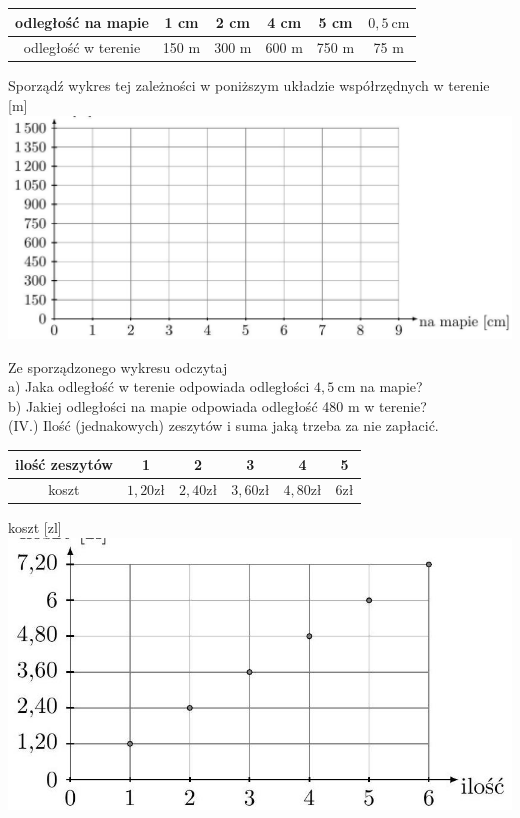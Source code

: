 \documentclass[10pt]{article}
\begin{document}
\begin{center}
\begin{tabular}{c|c|c|c|c|c}
odległość na mapie & 1 cm & 2 cm & 4 cm & 5 cm & \(0,5 \mathrm{~cm}\) \\
\hline
odległość w terenie & 150 m & 300 m & 600 m & 750 m & 75 m \\
\hline
\end{tabular}
\end{center}

Sporządź wykres tej zależności w poniższym układzie współrzędnych w terenie [m]\\
\includegraphics[max width=\textwidth, center]{2024_11_21_8f01584889ff06348ae7g-076(1)}

Ze sporządzonego wykresu odczytaj\\
a) Jaka odległość w terenie odpowiada odległości \(4,5 \mathrm{~cm}\) na mapie?\\
b) Jakiej odległości na mapie odpowiada odległość 480 m w terenie?\\
(IV.) Ilość (jednakowych) zeszytów i suma jaką trzeba za nie zapłacić.

\begin{center}
\begin{tabular}{c|c|c|c|c|c}
ilość zeszytów & 1 & 2 & 3 & 4 & 5 \\
\hline
koszt & \(1,20 \mathrm{zł}\) & \(2,40 \mathrm{zł}\) & \(3,60 \mathrm{zł}\) & \(4,80 \mathrm{zł}\) & \(6 \mathrm{zł}\) \\
\hline
\end{tabular}
\end{center}

koszt [zl]\\
\includegraphics[max width=\textwidth, center]{2024_11_21_8f01584889ff06348ae7g-076}
\end{document}
